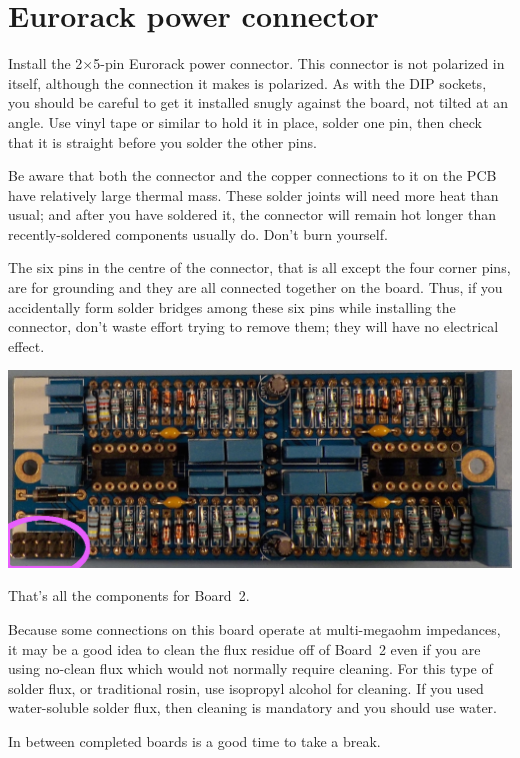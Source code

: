 \section{Eurorack power connector}

Install the 2$\times$5-pin Eurorack power connector.  This connector is not
polarized in itself, although the connection it makes is polarized.  As with
the DIP sockets, you should be careful to get it installed snugly against
the board, not tilted at an angle.  Use vinyl tape or similar to hold it in
place, solder one pin, then check that it is straight before you solder the
other pins.

Be aware that both the connector and the copper connections to it on the PCB
have relatively large thermal mass.  These solder joints will need more
heat than usual; and after you have soldered it, the connector will remain
hot longer than recently-soldered components usually do.  Don't burn
yourself.

The six pins in the centre of the connector, that is all except the four
corner pins, are for grounding and they are all connected together on the
board.  Thus, if you accidentally form solder bridges among these six pins
while installing the connector, don't waste effort trying to remove them;
they will have no electrical effect.

\noindent\includegraphics[width=\linewidth]{powerB.jpg}

That's all the components for Board~2.

Because some connections on this board operate at multi-megaohm impedances,
it may be a good idea to clean the flux residue off of Board~2 even if you
are using no-clean flux which would not normally require cleaning.  For
this type of solder flux, or traditional rosin, use isopropyl alcohol for
cleaning.  If you used water-soluble solder flux, then cleaning is
mandatory and you should use water.

In between completed boards is a good time to take a break.
